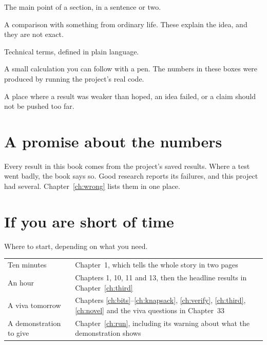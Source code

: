 \begin{bigidea}
The main point of a section, in a sentence or two.
\end{bigidea}
\begin{analogy}
A comparison with something from ordinary life. These explain the idea, and they are not exact.
\end{analogy}
\begin{newword}
Technical terms, defined in plain language.
\end{newword}
\begin{example}
A small calculation you can follow with a pen. The numbers in these boxes were produced by running the project's real code.
\end{example}
\begin{honest}
A place where a result was weaker than hoped, an idea failed, or a claim should not be pushed too far.
\end{honest}

\section*{A promise about the numbers}
Every result in this book comes from the project's saved results. Where a test went badly, the book says so. Good research reports its failures, and this project had several. Chapter~\ref{ch:wrong} lists them in one place.

\section*{If you are short of time}
\begin{gtable}{Where to start, depending on what you need.}
\begin{tabularx}{\linewidth}{l L}
\toprule
{} & \\
\midrule
Ten minutes & Chapter~1, which tells the whole story in two pages\\
An hour & Chapters 1, 10, 11 and 13, then the headline results in Chapter~\ref{ch:third}\\
A viva tomorrow & Chapters \ref{ch:bits}--\ref{ch:knapsack}, \ref{ch:verify}, \ref{ch:third}, \ref{ch:novel} and the viva questions in Chapter~33\\
A demonstration to give & Chapter~\ref{ch:run}, including its warning about what the demonstration shows\\
\bottomrule
\end{tabularx}
\end{gtable}

\clearpage
\renewcommand{\contentsname}{Contents}
{\setlength{\parskip}{0pt}\tableofcontents}
\clearpage
{}
\pagestyle{guide}
